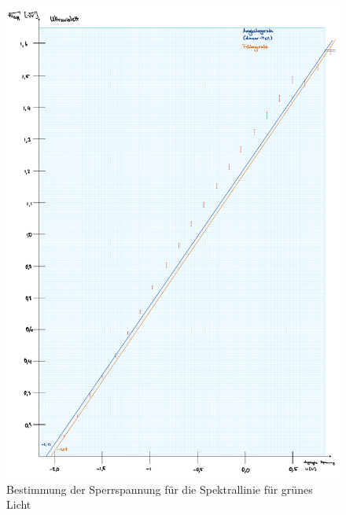 \begin{figure}[t!]
    \includegraphics[width=1\textwidth, page=4]{img/35/v35-Farbplots.pdf}
    \caption{Bestimmung der Sperrspannung für die Spektrallinie für grünes Licht}
    \label{fig:gr}
\end{figure}

\newpage

